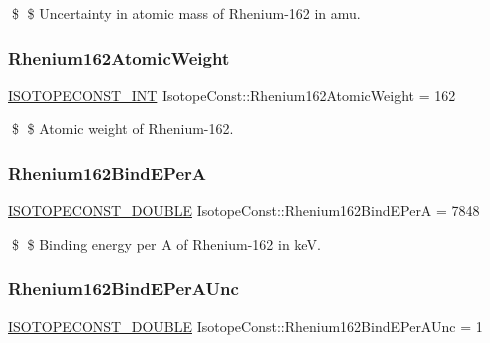 \$ \$ Uncertainty in atomic mass of Rhenium-\/162 in amu. \mbox{\label{group___isotope_const-_rhenium-_re162_ga808231b58891ff146cf24f33dfa1757c}} 
\subsubsection{\texorpdfstring{Rhenium162\+Atomic\+Weight}{Rhenium162AtomicWeight}}
{\footnotesize\ttfamily \mbox{\hyperlink{group___isotope_const-_macros_ga5f18360b3e99483a35c32d789e62621c}{I\+S\+O\+T\+O\+P\+E\+C\+O\+N\+S\+T\+\_\+\+I\+NT}} Isotope\+Const\+::\+Rhenium162\+Atomic\+Weight = 162}

\$ \$ Atomic weight of Rhenium-\/162. \mbox{\label{group___isotope_const-_rhenium-_re162_ga78a023946373d9ae02e634fb567b6413}} 
\subsubsection{\texorpdfstring{Rhenium162\+Bind\+E\+PerA}{Rhenium162BindEPerA}}
{\footnotesize\ttfamily \mbox{\hyperlink{group___isotope_const-_macros_ga8f45a7272ce02c0b4c65c44636ed719a}{I\+S\+O\+T\+O\+P\+E\+C\+O\+N\+S\+T\+\_\+\+D\+O\+U\+B\+LE}} Isotope\+Const\+::\+Rhenium162\+Bind\+E\+PerA = 7848}

\$ \$ Binding energy per A of Rhenium-\/162 in keV. \mbox{\label{group___isotope_const-_rhenium-_re162_ga18d15cbfe6466fd7d21c5aa940d182d8}} 
\subsubsection{\texorpdfstring{Rhenium162\+Bind\+E\+Per\+A\+Unc}{Rhenium162BindEPerAUnc}}
{\footnotesize\ttfamily \mbox{\hyperlink{group___isotope_const-_macros_ga8f45a7272ce02c0b4c65c44636ed719a}{I\+S\+O\+T\+O\+P\+E\+C\+O\+N\+S\+T\+\_\+\+D\+O\+U\+B\+LE}} Isotope\+Const\+::\+Rhenium162\+Bind\+E\+Per\+A\+Unc = 1}

